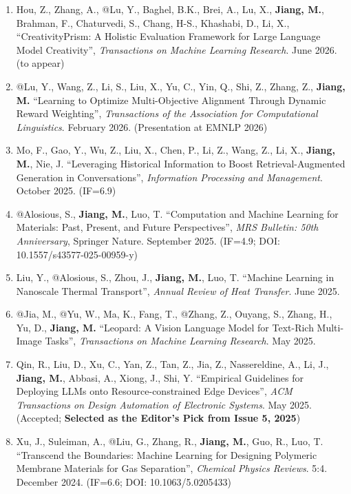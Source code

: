 \documentclass[10pt]{article}
\newenvironment{myindentpar}[1]%
{\begin{list}{}%
         {\setlength{\leftmargin}{#1}}%
         \item[]%
}
{\end{list}}
\newcounter{list}
\begin{document}
\begin{myindentpar}{0.00cm}
\begin{enumerate}[leftmargin=.5cm]
\item[J50] Hou, Z., Zhang, A., @Lu, Y., Baghel, B.K., Brei, A., Lu, X., \textbf{Jiang, M.}, Brahman, F., Chaturvedi, S., Chang, H-S., Khashabi, D., Li, X., ``CreativityPrism: A Holistic Evaluation Framework for Large Language Model Creativity'', \textit{Transactions on Machine Learning Research}. June 2026. (to appear)

\item[J49] @Lu, Y., Wang, Z., Li, S., Liu, X., Yu, C., Yin, Q., Shi, Z., Zhang, Z., \textbf{Jiang, M.} ``Learning to Optimize Multi-Objective Alignment Through Dynamic Reward Weighting'', \textit{Transactions of the Association for Computational Linguistics}. February 2026. (Presentation at EMNLP 2026)

\item[J48] Mo, F., Gao, Y., Wu, Z., Liu, X., Chen, P., Li, Z., Wang, Z., Li, X., \textbf{Jiang, M.}, Nie, J. ``Leveraging Historical Information to Boost Retrieval-Augmented Generation in Conversations'', \textit{Information Processing and Management}. October 2025. (IF=6.9)
		
\item[J47] @Alosious, S., \textbf{Jiang, M.}, Luo, T. ``Computation and Machine Learning for Materials: Past, Present, and Future Perspectives'', \textit{MRS Bulletin: 50th Anniversary}, Springer Nature. September 2025. (IF=4.9; DOI: 10.1557/s43577-025-00959-y)
	
\item[J46] Liu, Y., @Alosious, S., Zhou, J., \textbf{Jiang, M.}, Luo, T. ``Machine Learning in Nanoscale Thermal Transport'', \textit{
Annual Review of Heat Transfer}. June 2025.

\item[J45] @Jia, M., @Yu, W., Ma, K., Fang, T., @Zhang, Z., Ouyang, S., Zhang, H., Yu, D., \textbf{Jiang, M.} ``Leopard: A Vision Language Model for Text-Rich Multi-Image Tasks'', \textit{Transactions on Machine Learning Research}. May 2025.

\item[J44] Qin, R., Liu, D., Xu, C., Yan, Z., Tan, Z., Jia, Z., Nassereldine, A., Li, J., \textbf{Jiang, M.}, Abbasi, A., Xiong, J., Shi, Y. ``Empirical Guidelines for Deploying LLMs onto Resource-constrained Edge Devices'', \textit{ACM Transactions on Design Automation of Electronic Systems}. May 2025. (Accepted; \textbf{Selected as the Editor's Pick from Issue 5, 2025})

\item[J43] Xu, J., Suleiman, A., @Liu, G., Zhang, R., \textbf{Jiang, M.}, Guo, R., Luo, T. ``Transcend the Boundaries: Machine Learning for Designing Polymeric Membrane Materials for Gas Separation'', \textit{Chemical Physics Reviews}. 5:4. December 2024. (IF=6.6; DOI: 10.1063/5.0205433)


\end{enumerate}
\end{myindentpar}
\end{document}
